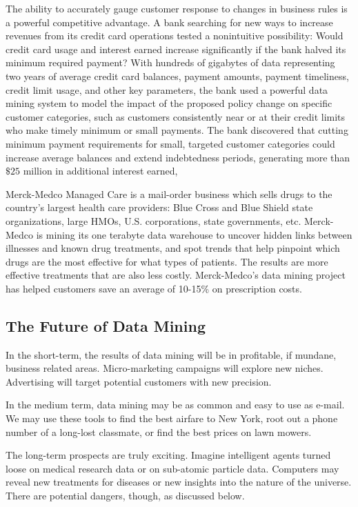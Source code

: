 The ability to accurately gauge customer response to changes in business rules is a powerful competitive advantage. A bank searching for new ways to increase revenues from its credit card operations tested a nonintuitive possibility: Would credit card usage and interest earned increase significantly if the bank halved its minimum required payment? With hundreds of gigabytes of data representing two years of average credit card balances, payment amounts, payment timeliness, credit limit usage, and other key parameters, the bank used a powerful data mining system to model the impact of the proposed policy change on specific customer categories, such as customers consistently near or at their credit limits who make timely minimum or small payments. The bank discovered that cutting minimum payment requirements for small, targeted customer categories could increase average balances and extend indebtedness periods, generating more than $\$25$ million in additional interest earned,

Merck-Medco Managed Care is a mail-order business which sells drugs to the country's largest health care providers: Blue Cross and Blue Shield state organizations, large HMOs, U.S. corporations, state governments, etc. Merck-Medco is mining its one terabyte data warehouse to uncover hidden links between illnesses and known drug treatments, and spot trends that help pinpoint which drugs are the most effective for what types of patients. The results are more effective treatments that are also less costly. Merck-Medco's data mining project has helped customers save an average of 10-15\% on prescription costs.

\subsection{The Future of Data Mining}
In the short-term, the results of data mining will be in profitable, if mundane, business related areas. Micro-marketing campaigns will explore new niches. Advertising will target potential customers with new precision.

In the medium term, data mining may be as common and easy to use as e-mail. We may use these tools to find the best airfare to New York, root out a phone number of a long-lost classmate, or find the best prices on lawn mowers.

The long-term prospects are truly exciting. Imagine intelligent agents turned loose on medical research data or on sub-atomic particle data. Computers may reveal new treatments for diseases or new insights into the nature of the universe. There are potential dangers, though, as discussed below.

